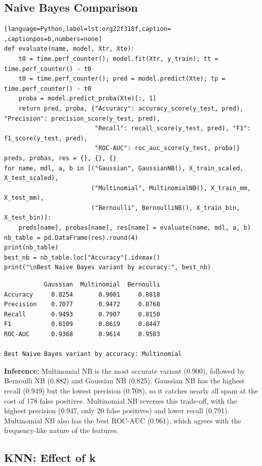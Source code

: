 \documentclass[11pt]{article}
\begin{document}
\subsection*{Naive Bayes Comparison}
\label{sec:org289b78f}

\begin{lstlisting}[language=Python,label=lst:org22f318f,caption= ,captionpos=b,numbers=none]
def evaluate(name, model, Xtr, Xte):
    t0 = time.perf_counter(); model.fit(Xtr, y_train); tt = time.perf_counter() - t0
    t0 = time.perf_counter(); pred = model.predict(Xte); tp = time.perf_counter() - t0
    proba = model.predict_proba(Xte)[:, 1]
    return pred, proba, {"Accuracy": accuracy_score(y_test, pred), "Precision": precision_score(y_test, pred),
                         "Recall": recall_score(y_test, pred), "F1": f1_score(y_test, pred),
                         "ROC-AUC": roc_auc_score(y_test, proba)}
preds, probas, res = {}, {}, {}
for name, mdl, a, b in [("Gaussian", GaussianNB(), X_train_scaled, X_test_scaled),
                        ("Multinomial", MultinomialNB(), X_train_mm, X_test_mm),
                        ("Bernoulli", BernoulliNB(), X_train_bin, X_test_bin)]:
    preds[name], probas[name], res[name] = evaluate(name, mdl, a, b)
nb_table = pd.DataFrame(res).round(4)
print(nb_table)
best_nb = nb_table.loc["Accuracy"].idxmax()
print("\nBest Naive Bayes variant by accuracy:", best_nb)
\end{lstlisting}

\begin{verbatim}
           Gaussian  Multinomial  Bernoulli
Accuracy     0.8254       0.9001     0.8818
Precision    0.7077       0.9472     0.8768
Recall       0.9493       0.7907     0.8150
F1           0.8109       0.8619     0.8447
ROC-AUC      0.9368       0.9614     0.9503

Best Naive Bayes variant by accuracy: Multinomial
\end{verbatim}


\textbf{Inference:} Multinomial NB is the most accurate variant (0.900), followed by Bernoulli NB (0.882) and
Gaussian NB (0.825). Gaussian NB has the highest recall (0.949) but the lowest precision
(0.708), so it catches nearly all spam at the cost of 178 false positives. Multinomial NB
reverses this trade-off, with the highest precision (0.947, only 20 false positives) and
lower recall (0.791). Multinomial NB also has the best ROC-AUC (0.961), which agrees with
the frequency-like nature of the features.

\subsection*{KNN: Effect of k}
\label{sec:orga03e3f0}
\end{document}
